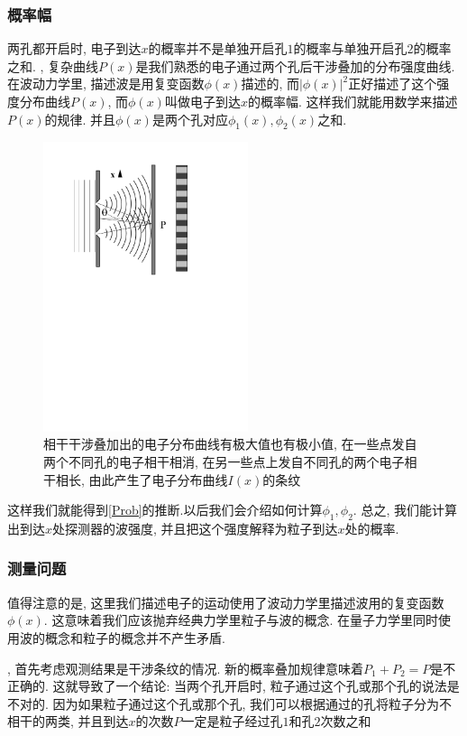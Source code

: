 \documentclass[a4paper,11pt]{article}
\begin{document}
\subsubsection{概率幅}
两孔都开启时, 电子到达$x$的概率并不是单独开启孔$1$的概率与单独开启孔$2$的概率之和.
, 复杂曲线$P(x)$是我们熟悉的电子通过两个孔后干涉叠加的分布强度曲线. 在波动力学里, 描述波是用复变函数$\phi(x)$描述的, 而$|\phi(x)|^2$正好描述了这个强度分布曲线$P(x)$, 而$\phi(x)$叫做电子到达$x$的概率幅. 这样我们就能用数学来描述$P(x)$的规律. 并且$\phi(x)$是两个孔对应$\phi_1(x),\phi_2(x)$之和.
\begin{figure}[H]
  \centering
  \includegraphics[width=6cm]{fig5.pdf}
  \caption{相干干涉叠加出的电子分布曲线有极大值也有极小值, 在一些点发自两个不同孔的电子相干相消, 在另一些点上发自不同孔的两个电子相干相长, 由此产生了电子分布曲线$I(x)$的条纹}\label{double slit 2}
\end{figure}
这样我们就能得到\ref{Prob}的推断.以后我们会介绍如何计算$\phi_1,\phi_2$. 总之, 我们能计算出到达$x$处探测器的波强度, 并且把这个强度解释为粒子到达$x$处的概率.
\subsubsection{测量问题}
值得注意的是, 这里我们描述电子的运动使用了波动力学里描述波用的复变函数$\phi(x)$. 这意味着我们应该抛弃经典力学里粒子与波的概念. 在量子力学里同时使用波的概念和粒子的概念并不产生矛盾.

, 首先考虑观测结果是干涉条纹的情况. 新的概率叠加规律意味着$P_1+P_2=P$是不正确的. 这就导致了一个结论: 当两个孔开启时, 粒子通过这个孔或那个孔的说法是不对的. 因为如果粒子通过这个孔或那个孔, 我们可以根据通过的孔将粒子分为不相干的两类, 并且到达$x$的次数$P$一定是粒子经过孔$1$和孔$2$次数之和
\end{document}
